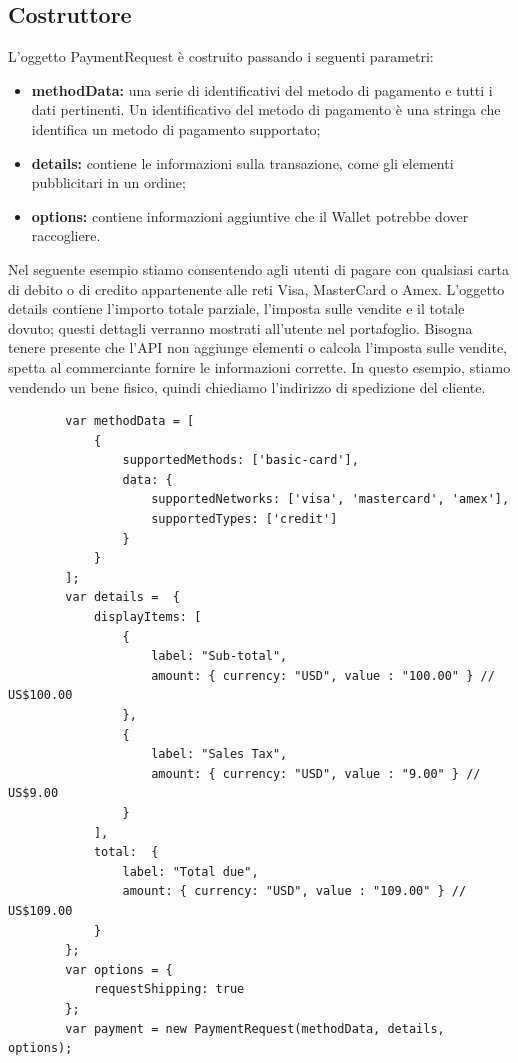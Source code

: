 \documentclass[11pt ,a4paper , twoside , openright ]{article}
\begin{document}
	\subsection{Costruttore}
	L'oggetto PaymentRequest è costruito passando i seguenti parametri:
	\begin{itemize}
	\item \textbf{methodData:} una serie di identificativi del metodo di pagamento e tutti i dati pertinenti. Un identificativo del metodo di pagamento è una stringa che identifica un metodo di pagamento supportato;
	\item \textbf{details:} contiene le informazioni sulla transazione, come gli elementi pubblicitari in un ordine;
	\item \textbf{options:} contiene informazioni aggiuntive che il Wallet potrebbe dover raccogliere.
	\end{itemize}

	Nel seguente esempio stiamo consentendo agli utenti di pagare con qualsiasi carta di debito o di credito appartenente alle reti Visa, MasterCard o Amex. L'oggetto details contiene l'importo totale parziale, l'imposta sulle vendite e il totale dovuto; questi dettagli verranno mostrati all'utente nel portafoglio. Bisogna tenere presente che l'API non aggiunge elementi o calcola l'imposta sulle vendite, spetta al commerciante fornire le informazioni corrette. In questo esempio, stiamo vendendo un bene fisico, quindi chiediamo l'indirizzo di spedizione del cliente.

	\begin{lstlisting}
		var methodData = [
			{     
				supportedMethods: ['basic-card'],     
				data: {          
					supportedNetworks: ['visa', 'mastercard', 'amex'],
					supportedTypes: ['credit']                 
				}    
			}     
		];
		var details =  {
			displayItems: [
				{
					label: "Sub-total",
					amount: { currency: "USD", value : "100.00" } // US$100.00
				},
				{
					label: "Sales Tax",
					amount: { currency: "USD", value : "9.00" } // US$9.00
				}
			],
			total:  {
				label: "Total due",
				amount: { currency: "USD", value : "109.00" } // US$109.00
			}
		};	
		var options = {
			requestShipping: true 
		};
		var payment = new PaymentRequest(methodData, details, options);
	\end{lstlisting}
	
\end{document}
